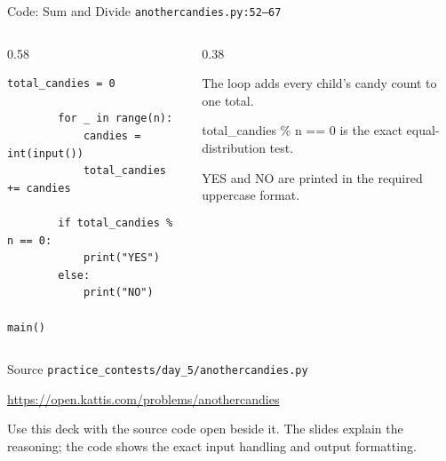 \documentclass[aspectratio=169,11pt]{beamer}
\begin{document}
\begin{frame}[fragile]{Code: Sum and Divide}
\scriptsize
{} \texttt{anothercandies.py:52--67}

\vspace{0.08cm}
\begin{columns}[T,totalwidth=\textwidth]
\begin{column}{0.58\textwidth}
\begin{lstlisting}[style=cpcode]
        total_candies = 0

        for _ in range(n):
            candies = int(input())
            total_candies += candies

        if total_candies % n == 0:
            print("YES")
        else:
            print("NO")

main()
\end{lstlisting}
\end{column}
\begin{column}{0.38\textwidth}
\begin{tightitemize}
  \item The loop adds every child's candy count to one total.
  \item total\_candies \% n == 0 is the exact equal-distribution test.
  \item YES and NO are printed in the required uppercase format.
\end{tightitemize}
\end{column}
\end{columns}
\end{frame}

\begin{frame}{Source}
\small
{} \texttt{practice\_contests/day\_5/anothercandies.py}

\vspace{0.3cm}
 \url{https://open.kattis.com/problems/anothercandies}

\vspace{0.45cm}
Use this deck with the source code open beside it. The slides explain the reasoning; the code shows the exact input handling and output formatting.
\end{frame}
\end{document}
